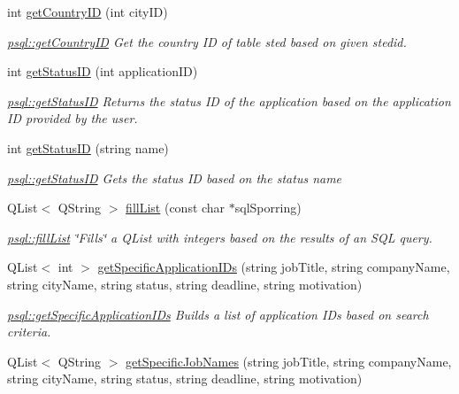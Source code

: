 \begin{DoxyCompactItemize}
int \mbox{\hyperlink{classpsql_a81d02dc0350ba11d90257914078ba432}{get\+Country\+ID}} (int city\+ID)
\begin{DoxyCompactList}\small\item\em \mbox{\hyperlink{classpsql_a81d02dc0350ba11d90257914078ba432}{psql\+::get\+Country\+ID}} Get the country ID of table sted based on given stedid. \end{DoxyCompactList}\item 
int \mbox{\hyperlink{classpsql_a9c02c92c09cb60c35d24375673b7df06}{get\+Status\+ID}} (int application\+ID)
\begin{DoxyCompactList}\small\item\em \mbox{\hyperlink{classpsql_a9c02c92c09cb60c35d24375673b7df06}{psql\+::get\+Status\+ID}} Returns the status ID of the application based on the application ID provided by the user. \end{DoxyCompactList}\item 
int \mbox{\hyperlink{classpsql_a9d13aebcb6d151719769207238865e75}{get\+Status\+ID}} (string name)
\begin{DoxyCompactList}\small\item\em \mbox{\hyperlink{classpsql_a9c02c92c09cb60c35d24375673b7df06}{psql\+::get\+Status\+ID}} Gets the status ID based on the status name \end{DoxyCompactList}\item 
Q\+List$<$ Q\+String $>$ \mbox{\hyperlink{classpsql_a2ad41caea89dc5af0b55b12f6394fbf5}{fill\+List}} (const char $\ast$sql\+Sporring)
\begin{DoxyCompactList}\small\item\em \mbox{\hyperlink{classpsql_a2ad41caea89dc5af0b55b12f6394fbf5}{psql\+::fill\+List}} \char`\"{}\+Fills\char`\"{} a Q\+List with integers based on the results of an S\+QL query. \end{DoxyCompactList}\item 
Q\+List$<$ int $>$ \mbox{\hyperlink{classpsql_ab6edb8a2e42d8ac7c4ae29f5b0cb494f}{get\+Specific\+Application\+I\+Ds}} (string job\+Title, string company\+Name, string city\+Name, string status, string deadline, string motivation)
\begin{DoxyCompactList}\small\item\em \mbox{\hyperlink{classpsql_ab6edb8a2e42d8ac7c4ae29f5b0cb494f}{psql\+::get\+Specific\+Application\+I\+Ds}} Builds a list of application I\+Ds based on search criteria. \end{DoxyCompactList}\item 
Q\+List$<$ Q\+String $>$ \mbox{\hyperlink{classpsql_a029f2ef38c4156cc6c67765900c8245f}{get\+Specific\+Job\+Names}} (string job\+Title, string company\+Name, string city\+Name, string status, string deadline, string motivation)

\end{DoxyCompactItemize}
